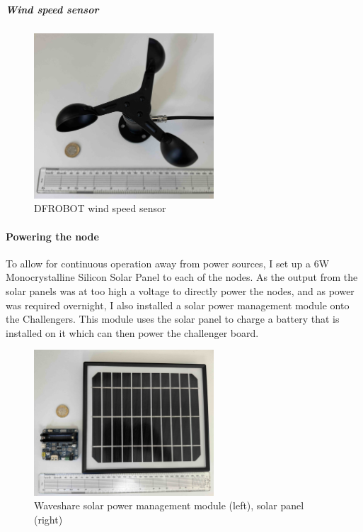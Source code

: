 \subparagraph{Wind speed sensor}

\begin{figure}[H]
    \centering
    \includegraphics[width=0.6\textwidth]{contents/part-2/fig2/wind-sensor.jpg}
    \caption{DFROBOT wind speed sensor}
    \label{fig:wind-sensor}
\end{figure}

\paragraph{Powering the node}

To allow for continuous operation away from power sources, I set up a 6W
Monocrystalline Silicon Solar Panel to each of the nodes. As the output from the
solar panels was at too high a voltage to directly power the nodes, and as power
was required overnight, I also installed a solar power management module onto
the Challengers. This module uses the solar panel to charge a battery that is
installed on it which can then power the challenger board.

\begin{figure}[H]
    \centering
    \includegraphics[width=0.6\textwidth]{contents/part-2/fig2/solar-panel-manager.jpg}
    \caption{Waveshare solar power management module (left), solar panel (right)}
    \label{fig:solar-module}
\end{figure}

